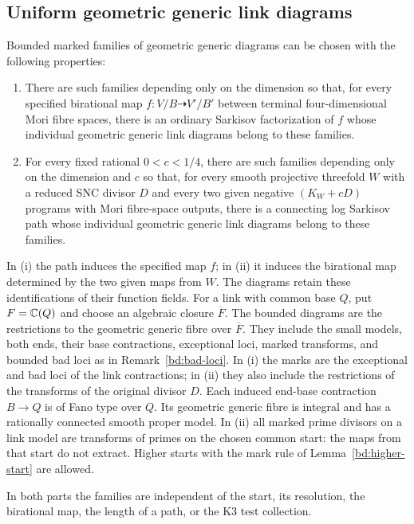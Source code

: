 \subsection{Uniform geometric generic link diagrams}

\begin{theorem}
\label{bd:diagrams}
Bounded marked families of geometric generic diagrams can be chosen
with the following properties:
\begin{enumerate}[label=\textup{(\roman*)}]
\item There are such families depending only on the dimension so
that, for every specified birational map
$f:V/B\dashrightarrow V'/B'$ between terminal four-dimensional
Mori fibre spaces, there is an ordinary Sarkisov factorization of
$f$ whose individual geometric generic link diagrams belong to
these families.
\item For every fixed rational $0<c<1/4$, there are such families
depending only on the dimension and $c$ so that, for every smooth
projective threefold $W$ with a reduced SNC divisor $D$ and every
two given negative $(K_W+cD)$ programs with Mori fibre-space outputs,
there is a connecting log Sarkisov path whose individual geometric
generic link diagrams belong to these families.
\end{enumerate}
In \textup{(i)} the path induces the specified map $f$; in
\textup{(ii)} it induces the birational map determined by the two
given maps from $W$. The diagrams retain these identifications of
their function fields.
For a link with common base $Q$, put $F=\mathbb C(Q)$ and choose an
algebraic closure $\overline F$. The bounded diagrams are the
restrictions to the geometric generic fibre over $\overline F$.
They include the small models, both ends,
their base contractions, exceptional loci, marked transforms,
and bounded bad loci as in Remark~\ref{bd:bad-loci}.
In \textup{(i)} the marks are the exceptional and bad loci of the
link contractions; in \textup{(ii)} they also include the restrictions
of the transforms of the original divisor $D$.
Each induced end-base contraction $B\to Q$ is of Fano type
over $Q$.  Its geometric generic fibre is integral and has
a rationally connected smooth proper model.
In \textup{(ii)} all marked prime divisors on a link model are
transforms of primes on the chosen common start: the maps
from that start do not extract.  Higher starts with the mark
rule of Lemma~\ref{bd:higher-start} are allowed.

In both parts the families are independent of the start, its
resolution, the birational map,
the length of a path, or the K3 test collection.
\end{theorem}

